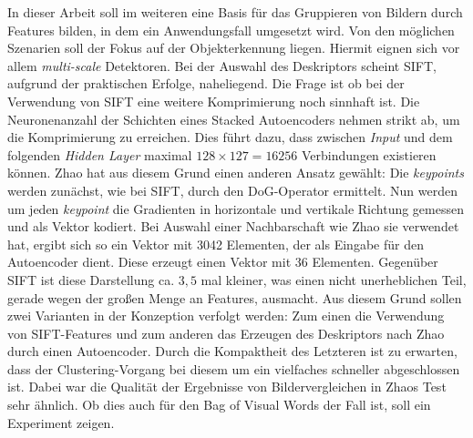 In dieser Arbeit soll im weiteren eine Basis für das Gruppieren von Bildern durch Features bilden, in dem ein Anwendungsfall umgesetzt wird. Von den möglichen Szenarien soll der Fokus auf der Objekterkennung liegen. Hiermit eignen sich vor allem \textit{multi-scale} Detektoren. Bei der Auswahl des Deskriptors scheint SIFT, aufgrund der praktischen Erfolge, naheliegend. Die Frage ist ob bei der Verwendung von SIFT eine weitere Komprimierung noch sinnhaft ist. Die Neuronenanzahl der Schichten eines Stacked Autoencoders nehmen strikt ab, um die Komprimierung zu erreichen. Dies führt dazu, dass zwischen \textit{Input} und dem folgenden \textit{Hidden Layer} maximal $128 \times 127 = 16256$ Verbindungen existieren können. Zhao  hat aus diesem Grund einen anderen Ansatz gewählt: Die \textit{keypoints} werden zunächst, wie bei SIFT, durch den DoG-Operator ermittelt. Nun werden um jeden \textit{keypoint} die Gradienten in horizontale und vertikale Richtung gemessen und als Vektor kodiert. Bei Auswahl einer Nachbarschaft wie Zhao sie verwendet hat, ergibt sich so ein Vektor mit 3042 Elementen, der als Eingabe für den Autoencoder dient. Diese erzeugt einen Vektor mit 36 Elementen. Gegenüber SIFT ist diese Darstellung ca. $3,5$ mal kleiner, was einen nicht unerheblichen Teil, gerade wegen der großen Menge an Features, ausmacht.\newline
Aus diesem Grund sollen zwei Varianten in der Konzeption verfolgt werden: Zum einen die Verwendung von SIFT-Features und zum anderen das Erzeugen des Deskriptors nach Zhao durch einen Autoencoder. Durch die Kompaktheit des Letzteren ist zu erwarten, dass der Clustering-Vorgang bei diesem um ein vielfaches schneller abgeschlossen ist. Dabei war die Qualität der Ergebnisse von Bildervergleichen in Zhaos Test sehr ähnlich. Ob dies auch für den Bag of Visual Words der Fall ist, soll ein Experiment zeigen.